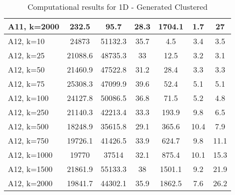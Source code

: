\documentclass{article}
\begin{document}
\begin{center}
\begin{table}[h]
\begin{tabular}{|l||c|c|c|c|c|c|}
    A11, k=2000 & 232.5 & 95.7 & 28.3 & 1704.1 & 1.7 & 27\\
    \hline
    A12, k=10 & 24873 & 51132.3 & 35.7 & 4.5 & 3.4 & 3.5\\
    A12, k=25 & 21088.6 & 48735.3 & 33 & 12.5 & 3.2 & 3.1\\
    A12, k=50 & 21460.9 & 47522.8 & 31.2 & 28.4 & 3.3 & 3.3\\
    A12, k=75 & 25308.3 & 47099.9 & 39.6 & 52.4 & 5.1 & 5.1\\
    A12, k=100 & 24127.8 & 50086.5 & 36.8 & 71.5 & 5.2 & 4.8\\
    A12, k=250 & 21140.3 & 42213.4 & 33.3 & 193.9 & 9.8 & 6.5\\
    A12, k=500 & 18248.9 & 35615.8 & 29.1 & 365.6 & 10.4 & 7.9\\
    A12, k=750 & 19726.1 & 41426.5 & 33.9 & 624.7 & 9.8 & 11.1\\
    A12, k=1000 & 19770 & 37514 & 32.1 & 875.4 & 10.1 & 15.3\\
    A12, k=1500 & 21861.9 & 55133.3 & 38 & 1501.1 & 9.2 & 21.9\\
A12, k=2000 & 19841.7 & 44302.1 & 35.9 & 1862.5 & 7.6 & 26.2\\
    \hline
    \end{tabular}
    \caption{Computational results for 1D - Generated Clustered}
    \label{tab:1d_res_generated}
\end{table}
\end{center}
\end{document}
